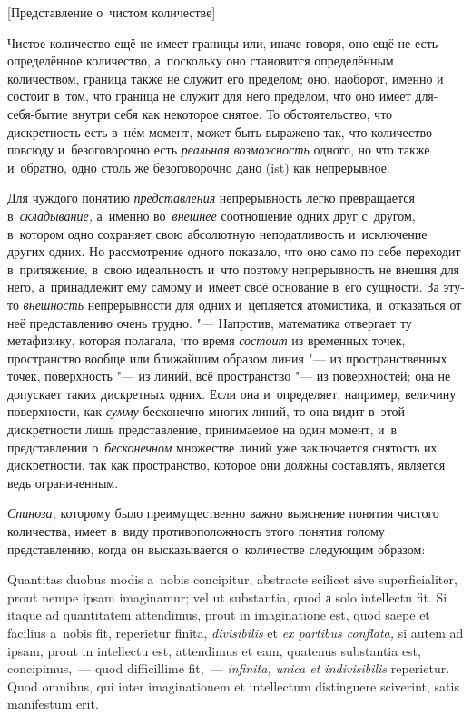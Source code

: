 %
{[Представление о~чистом количестве]}

Чистое количество ещё не имеет границы или, иначе говоря, оно ещё не есть
определённое количество, а~поскольку оно становится определённым
количеством, граница также не служит его пределом; оно, наоборот, именно и
состоит в~том, что граница не служит для него пределом, что оно имеет
для-себя-бытие внутри себя как некоторое снятое. То обстоятельство, что
дискретность есть в~нём момент, может быть выражено так, что количество
повсюду и~безоговорочно есть {\em реальная возможность} одного, но
что также и~обратно, одно столь же безоговорочно дано (ist) как непрерывное.

Для чуждого понятию {\em представления} непрерывность легко превращается
в~{\em складывание,} а~именно во~{\em внешнее} соотношение одних друг с~другом,
в~котором одно сохраняет свою абсолютную неподатливость и~исключение других
одних. Но рассмотрение одного показало, что оно само по себе переходит
в~притяжение, в~свою идеальность и~что поэтому непрерывность не внешня для
него, а~принадлежит ему самому и~имеет своё основание в~его сущности. За эту-то
{\em внешность} непрерывности для одних и~цепляется атомистика, и~отказаться от
неё представлению очень трудно. "--- Напротив, математика отвергает ту
метафизику, которая полагала, что время {\em состоит} из временных точек,
пространство вообще или ближайшим образом линия "--- из пространственных точек,
поверхность "--- из линий, всё пространство "--- из поверхностей; она не
допускает таких дискретных одних. Если она и~определяет, например, величину
поверхности, как {\em сумму} бесконечно многих линий, то она видит в~этой
дискретности лишь представление, принимаемое на один момент, и~в представлении
о~{\em бесконечном} множестве линий уже заключается снятость их дискретности,
так как пространство, которое они должны составлять, является ведь
ограниченным.

{\em Спиноза,} которому было преимущественно важно выяснение понятия чистого
количества, имеет в~виду противоположность этого понятия голому представлению,
когда он высказывается о~количестве следующим образом:

\vspace{3mm}

\begin{footnotesize}\fontsize{10}{13}\selectfont
Quantitas duobus modis a~nobis conci\-pitur, abs\-trac\-te scili\-cet
sive super\-fi\-ci\-ali\-ter, prout nempe ipsam ima\-gina\-mur; vel ut
sub\-stan\-tia, quod а solo intel\-lectu fit. Si itaque ad quanti\-tatem
atten\-di\-mus, prout in imagin\-ati\-one est, quod saepe et faci\-lius
a~nobis fit, repe\-rietur finita, {\em divi\-sibi\-lis} et
{\em ex parti\-bus con\-flata,} si autem ad ipsam, prout in intel\-lectu est,
atten\-di\-mus et eam, quate\-nus sub\-stan\-tia est, con\-cipi\-mus,~--- quod
dif\-ficil\-lime fit,~--- {\em infi\-nita, unica et indi\-vi\-si\-bi\-lis}
re\-pe\-rietur. Quod omni\-bus, qui inter ima\-gi\-na\-tio\-nem et
intel\-lectum dis\-tin\-guere scive\-rint, satis mani\-fes\-tum erit.\par
\end{footnotesize}

